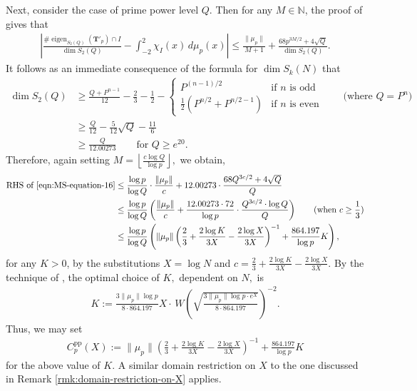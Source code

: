 \documentclass[11pt,letterpaper,reqno]{amsart}
\theoremstyle{definition}
\numberwithin{equation}{section}
\numberwithin{figure}{section}
\numberwithin{table}{section}
\begin{document}
Next, consider the case of prime power level $Q$.
Then for any $M \in \mathbb{N}$, the proof of \cite[(16)]{MS07} gives that
\begin{align}
    \left|
\frac{\# \operatorname{eigen}_{S_2(Q)}(\mathbf{T}'_p) \cap I}
{\dim S_2(Q)}
-
\int_{-2}^2 \chi_I(x)\, d\mu_p(x)
\right| \leq \frac{\| \mu_p\|}{M + 1} + \frac{68 p^{3M/2} + 4\sqrt{Q}}{\dim S_2(Q)}. \label{eqn:MS-equation-16}
\end{align}
It follows as an immediate consequence of the formula \cite[Theorem 13]{MS07} for $\dim S_k(N)$ that
\begin{align}
    \dim S_2(Q) &\geq \frac{Q + P^{n - 1}}{12} - \frac{2}{3} - \frac{1}{2} - \begin{cases}
        P^{(n - 1)/2} & \text{if $n$ is odd}\\
        \frac{1}{2} \left( P^{n/2} + P^{n/2 - 1} \right) & \text{if $n$ is even}
    \end{cases}
    \qquad \text{(where $Q=P^n$)}
    \\
    &\geq \frac{Q}{12} - \frac{5}{12} \sqrt{Q} - \frac{11}{6}\\
    & \geq \frac{Q}{12.00273} \qquad \text{for $Q \geq e^{20}$.}
\end{align}
Therefore, again setting $M = \left\lfloor \frac{c \log Q}{\log p} \right\rfloor,$ we obtain,
\begin{align}
    \text{RHS of \eqref{eqn:MS-equation-16}} &\leq \frac{\log p}{\log Q} \cdot \frac{\| \mu_p\|}{c} + 12.00273 \cdot \frac{68 Q^{3c/2} + 4\sqrt{Q}}{Q}\\
    &\leq \frac{\log p}{\log Q} \left(  \frac{\| \mu_p\|}{c} + \frac{12.00273 \cdot 72}{\log p} \cdot \frac{ Q^{3c/2} \cdot \log Q}{Q} \right) \qquad \text{(when $c \geq \frac{1}{3}$)}\\
    &\leq \frac{\log p}{\log Q}  \left( \| \mu_p \| \left( \frac{2}{3} + \frac{2 \log K}{3X} - \frac{2\log X}{3X}  \right)^{-1} +  \frac{864.197}{\log p}K  \right),
\end{align}
for any $K > 0$, by the substitutions $X = \log N$ and $c = \frac{2}{3} + \frac{2 \log K}{3X} - \frac{2\log X}{3X}.$ By the technique of \cite[Appendix A]{KMRX}, the optimal choice of $K,$ dependent on $N,$ is
\begin{align}
    K := \frac{3\|\mu_p \| \log p}{8 \cdot 864.197} X \cdot  \, W\! \left( \sqrt{ \frac{3 \|\mu_p \| \log p \cdot e^X}{8 \cdot 864.197}  }  \right)^{-2}.
\end{align} 
Thus, we may set
\begin{align}
    C_p^{\operatorname{pp}}(X) := \| \mu_p \| \left( \frac{2}{3} + \frac{2 \log K}{3X} - \frac{2\log X}{3X}  \right)^{-1} +  \frac{864.197}{\log p}K \label{eqn:formula-for-C-pp}
\end{align}
for the above value of $K.$ A similar domain restriction on $X$ to the one discussed in Remark \ref{rmk:domain-restriction-on-X} applies.
\end{document}
